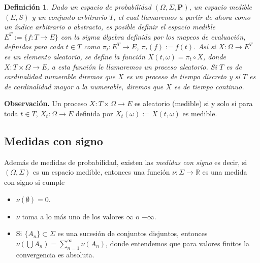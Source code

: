 \documentclass[letterpaper]{article}
\newtheorem{def.}{Definici\'on}[section]
\newcommand{\prob}{\textbf{P}}
\newcommand{\obs}{{\newline \noindent \sc \textbf{Observación. }}}
\newcommand{\om}{\ensuremath{\Omega}}
\newcommand{\sig}{\ensuremath{\Sigma}}
\newcommand{\re}{\ensuremath{\mathbb R }}
\begin{document}
\begin{def.}
Dado un espacio de probabilidad \((\om,\sig,\prob)\), un espacio medible \((E,S)\) y un conjunto arbitrario \(T\), el cual llamaremos a partir de ahora como un \emph{índice arbitrario o abstracto}, es posible definir el espacio medible \(E^{T}:=\{f:T\rightarrow E\}\) con la sigma álgebra definida por los mapeos de evaluación, definidos para cada \(t\in T\) como \(\pi_t:E^{T}\rightarrow E\), \(\pi_t(f):=f(t)\). Así si \(X:\om\rightarrow E^{T}\) es un elemento aleatorio, se define la función \(X(t,\omega)=\pi_t\circ X\), donde \(X:T\times\om\rightarrow E\), a esta función le llamaremos un \emph{proceso aleatorio}. Si \(T\) es de cardinalidad numerable diremos que \(X\) es un proceso de tiempo discreto y si \(T\) es de cardinalidad mayor a la numerable, diremos que \(X\) es de tiempo continuo.
\end{def.}
\obs Un proceso \(X:T\times\om\rightarrow E\) es aleatorio (medible) si y solo si para toda \(t\in T\), \(X_t:\om\rightarrow E\) definida por \(X_t(\omega):=X(t,\omega)\) es medible.

\subsection{Medidas con signo}
\label{sec:org6148d8a}

\noindent Además de medidas de probabilidad, existen las \emph{medidas con signo} es decir, si \((\Omega,\Sigma)\) es un espacio medible, entonces una función \(\nu:\Sigma\rightarrow\re\) es una medida con signo si cumple

\begin{itemize}
\item \(\nu(\emptyset)=0\).
\item \(\nu\) toma a lo más uno de los valores \(\infty\) o \(-\infty\).
\item Si \(\{A_n\}\subset\Sigma\) es una sucesión de conjuntos disjuntos, entonces \(\nu(\bigcup A_n)=\sum_{n=1}^{\infty} \nu(A_n)\), donde entendemos que para valores finitos la convergencia es absoluta.
\end{itemize}
\end{document}
